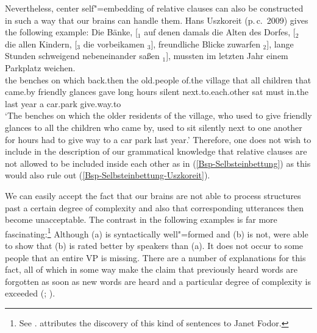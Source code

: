 Nevertheless, center self"=embedding of relative clauses can also be constructed in such a way that our brains can handle them. Hans
Uszkoreit (p.\,c.\ 2009)
gives the following example:
\ea
\label{Bsp-Selbsteinbettung-Uszkoreit}
\gll Die Bänke, [$_1$ auf denen damals die Alten des Dorfes, [$_2$ die allen Kindern, [$_3$ die vorbeikamen $_3$], freundliche Blicke zuwarfen $_2$], 
lange Stunden schweigend nebeneinander saßen $_1$], mussten im letzten Jahr einem Parkplatz weichen.\\
the benches {} on which back.then the old.people of.the village {} that all children {} that came.by {} friendly glances gave {}
long hours silent next.to.each.other sat {} must in.the last year a car.park give.way.to\\
\glt `The benches on which the older residents of the village, who used to give friendly glances to all the children who came by, used to sit silently next to one 
another for hours had to give way to a car park last year.'
\z
Therefore, one does not wish to include in the description of our grammatical knowledge that
relative clauses are not allowed to be included inside each other as in (\ref{Bsp-Selbsteinbettung})  
as this would also rule out (\ref{Bsp-Selbsteinbettung-Uszkoreit}).

We can easily accept the fact that our brains are not able to process structures past a certain degree of complexity and also that corresponding utterances then become unacceptable.
The contrast in the following examples is far more fascinating:\footnote{
See . \citet[]{Frazier85a-u} 
attributes the discovery of this kind of sentences to Janet Fodor.
}
\eal
{}
\zl
Although (a)  is syntactically well"=formed and (b) is not, \citet{GT99a} were able to
show that (b) is rated better by speakers than (a). It does not occur to some people that an entire
VP is missing. There are a number of explanations for this fact, all of which in
some way make the claim that previously heard words are forgotten as soon as new words are heard and
a particular degree of complexity is exceeded (\citealp[]{Frazier85a-u}; \citealp{GT99a}). 

